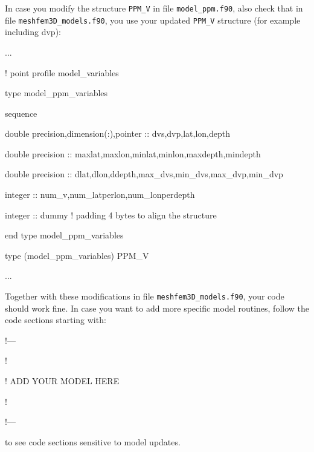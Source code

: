 \documentclass[oneside,english]{book}
\newenvironment{lyxcode}
{\begin{list}{}{
\setlength{\rightmargin}{\leftmargin}
\setlength{\listparindent}{0pt}%
\raggedright
\setlength{\itemsep}{0pt}
\setlength{\parsep}{0pt}
\normalfont\ttfamily}%
 \item[]}
{\end{list}}
\begin{document}
\begin{description}
\begin{enumerate}
  \item In case you modify the structure \texttt{PPM\_V} in file \texttt{model\_ppm.f90},
  also check that in file \texttt{meshfem3D\_models.f90}, you use your updated \texttt{PPM\_V} structure (for example including dvp):
  \begin{lyxcode}
{\footnotesize  ... }{\footnotesize \par}
{\footnotesize! point profile model\_variables }{\footnotesize \par}
{\footnotesize type model\_ppm\_variables }{\footnotesize \par}
{\footnotesize   sequence }{\footnotesize \par}
{\footnotesize   double precision,dimension(:),pointer :: dvs,dvp,lat,lon,depth }{\footnotesize \par}
{\footnotesize   double precision :: maxlat,maxlon,minlat,minlon,maxdepth,mindepth }{\footnotesize \par}
{\footnotesize   double precision :: dlat,dlon,ddepth,max\_dvs,min\_dvs,max\_dvp,min\_dvp }{\footnotesize \par}
{\footnotesize   integer :: num\_v,num\_latperlon,num\_lonperdepth }{\footnotesize \par}
{\footnotesize   integer :: dummy ! padding 4 bytes to align the structure }{\footnotesize \par}
{\footnotesize end type model\_ppm\_variables }{\footnotesize \par}
{\footnotesize type (model\_ppm\_variables) PPM\_V }{\footnotesize \par}
{\footnotesize  ... }{\footnotesize \par}
  \end{lyxcode}

  Together with these modifications in file \texttt{meshfem3D\_models.f90}, your code should work fine.
  In case you want to add more specific model routines, follow the code sections starting with:
  \begin{lyxcode}
{\footnotesize  !--- }{\footnotesize \par}
{\footnotesize  ! }{\footnotesize \par}
{\footnotesize  ! ADD YOUR MODEL HERE }{\footnotesize \par}
{\footnotesize  ! }{\footnotesize \par}
{\footnotesize  !--- }{\footnotesize \par}
  \end{lyxcode}
  to see code sections sensitive to model updates.

  \end{enumerate}

\end{description}
\end{document}
